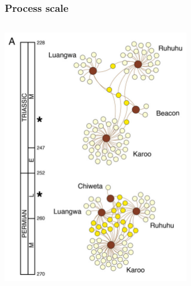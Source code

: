 \documentclass{beamer}
\begin{document}
\begin{frame}
  \frametitle{Process scale}

  \begin{columns}
    \begin{column}{0.55\textwidth}
      \includegraphics[height=0.7\textheight,width=\textwidth,keepaspectratio=true]{figure/permian}


\end{column}
\end{columns}
\end{frame}
\end{document}

